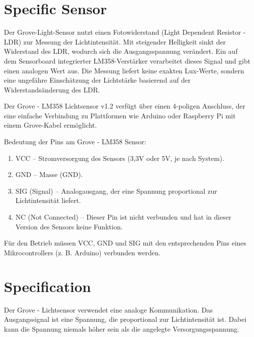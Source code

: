 \section{Specific Sensor}

Der Grove-Light-Sensor nutzt einen Fotowiderstand (Light Dependent Resistor - LDR) zur Messung der Lichtintensität. Mit steigender Helligkeit sinkt der Widerstand des LDR, wodurch sich die Ausgangsspannung verändert. Ein auf dem Sensorboard integrierter LM358-Verstärker verarbeitet dieses Signal und gibt einen analogen Wert aus. Die Messung liefert keine exakten Lux-Werte, sondern eine ungefähre Einschätzung der Lichtstärke basierend auf der Widerstandsänderung des LDR.

Der Grove - LM358 Lichtsensor v1.2 verfügt über einen 4-poligen Anschluss, der eine einfache Verbindung zu Plattformen wie Arduino oder Raspberry Pi mit einem Grove-Kabel ermöglicht.

Bedeutung der Pins am Grove - LM358 Sensor:

\begin{enumerate}
	\item VCC -- Stromversorgung des Sensors (3,3V oder 5V, je nach System).
	\item GND -- Masse (GND).
	\item SIG (Signal) -- Analogausgang, der eine Spannung proportional zur Lichtintensität liefert.
	\item NC (Not Connected) -- Dieser Pin ist nicht verbunden und hat in dieser Version des Sensors keine Funktion.
\end{enumerate}

Für den Betrieb müssen VCC, GND und SIG mit den entsprechenden Pins eines Mikrocontrollers (z. B. Arduino) verbunden werden. 


\section{Specification}
Der Grove - Lichtsensor verwendet eine analoge Kommunikation. Das Ausgangssignal ist eine Spannung, die proportional zur Lichtintensität ist. Dabei kann die Spannung niemals höher sein als die angelegte Versorgungsspannung.



